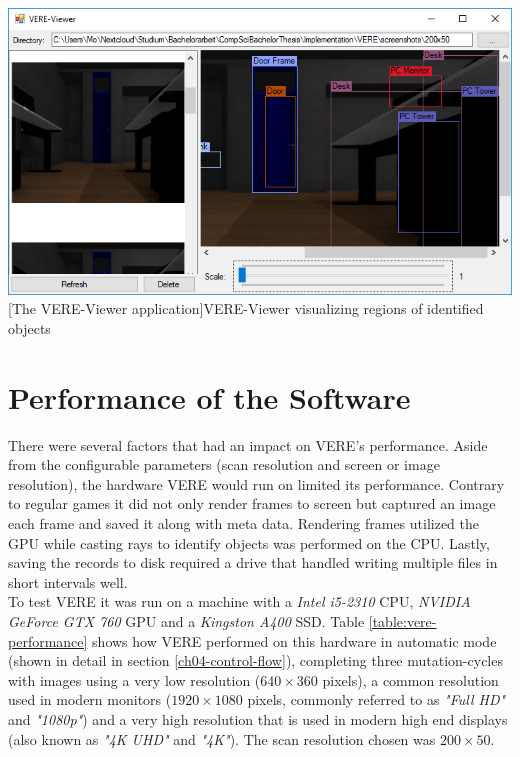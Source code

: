 \begin{center}
\noindent\includegraphics[width=14cm]{tex/img/ch05/VERE_Viewer_Application02.png}
[The VERE-Viewer application]{VERE-Viewer visualizing regions of identified objects}
\label{fig:vere-viewer}
\end{center}

\section{Performance of the Software}
There were several factors that had an impact on \ac{VERE}'s performance. Aside from the configurable parameters (scan resolution and screen or image resolution), the hardware \ac{VERE} would run on limited its performance. Contrary to regular games it did not only render frames to screen but captured an image each frame and saved it along with meta data. Rendering frames utilized the GPU while casting rays to identify objects was performed on the CPU. Lastly, saving the records to disk required a drive that handled writing multiple files in short intervals well.\\
To test \ac{VERE} it was run on a machine with a \textit{Intel i5-2310} CPU, \textit{NVIDIA GeForce GTX 760} GPU and a \textit{Kingston A400} SSD.
Table \ref{table:vere-performance} shows how \ac{VERE} performed on this hardware in automatic mode (shown in detail in section \ref{ch04-control-flow}), completing three mutation-cycles with images using a very low resolution ($640 \times 360$ pixels), a common resolution used in modern monitors ($1920 \times 1080$ pixels, commonly referred to as \textit{"Full HD"} and \textit{"1080p"}) and a very high resolution that is used in modern high end displays (also known as \textit{"4K UHD"} and \textit{"4K"}). The scan resolution chosen was $200 \times 50$.

